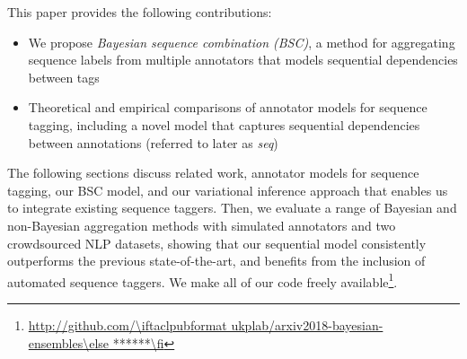 %

This paper provides the following contributions:
\begin{itemize}
 \item We propose \emph{Bayesian sequence combination (BSC)}, 
 a method for aggregating sequence labels from multiple annotators 
 that models sequential dependencies between tags 
 \item Theoretical and empirical comparisons of annotator models 
  for sequence tagging, including a novel model that captures sequential dependencies between annotations (referred to later as \emph{seq})
\end{itemize}
The following sections discuss related work, 
annotator models for sequence tagging,
our BSC model, and our variational inference approach
 that enables us to integrate existing sequence taggers. 
Then, we evaluate a range of Bayesian and non-Bayesian aggregation methods
with simulated annotators and two crowdsourced NLP datasets,
showing that our sequential model consistently outperforms the previous state-of-the-art,
and benefits from the inclusion of automated sequence taggers.
We make 
all of our code freely available\footnote{\url{http://github.com/\iftaclpubformat ukplab/arxiv2018-bayesian-ensembles\else ******\fi}}.


